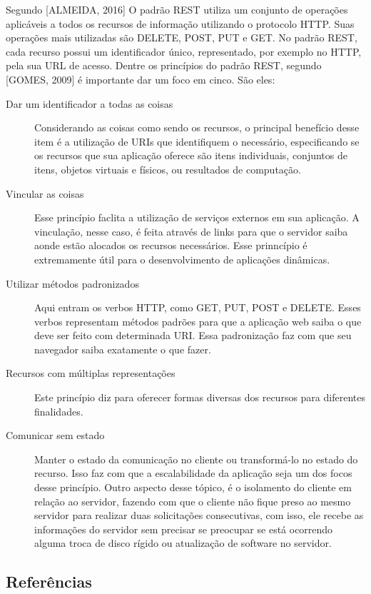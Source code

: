 \documentclass[
	12pt,				%
	oneside,			%
	a4paper,			%
	brazil				%
]{abntex2}
\begin{document}
{Segundo [ALMEIDA, 2016] O padrão REST utiliza um conjunto de operações aplicáveis a todos os recursos de informação utilizando o protocolo HTTP. Suas operações mais utilizadas são DELETE, POST, PUT e GET.
No padrão REST, cada recurso possui um identificador único, representado, por exemplo no HTTP, pela sua URL de acesso.
Dentre os princípios do padrão REST, segundo [GOMES, 2009] é importante dar um foco em cinco.
São eles: 
\begin{description}
\item[Dar um identificador a todas as coisas]
Considerando as coisas como sendo os recursos, o principal benefício desse item é a utilização de URIs que identifiquem o necessário, especificando se os recursos que sua aplicação oferece são itens individuais, conjuntos de itens, objetos virtuais e físicos, ou resultados de computação.  
\item[Vincular as coisas]
Esse princípio faclita a utilização de serviços externos em sua aplicação. A vinculação, nesse caso, é feita através de links para que o servidor saiba aonde estão alocados os recursos necessários. Esse prinncípio é extremamente útil para o desenvolvimento de aplicações dinâmicas.
\item[Utilizar métodos padronizados]
Aqui entram os verbos HTTP, como GET, PUT, POST e DELETE. Esses verbos representam métodos padrões para que a aplicação web saiba o que deve ser feito com determinada URI. Essa padronização faz com que seu navegador saiba exatamente o que fazer.
\item[Recursos com múltiplas representações]
Este princípio diz para oferecer formas diversas dos recursos para diferentes finalidades. 	
\item[Comunicar sem estado]
Manter o estado da comunicação no cliente ou transformá-lo no estado do recurso. Isso faz com que a escalabilidade da aplicação seja um dos focos desse princípio. Outro aspecto desse tópico, é o isolamento do cliente em relação ao servidor, fazendo com que o cliente não fique preso ao mesmo servidor para realizar duas solicitações consecutivas, com isso, ele recebe as informações do servidor sem precisar se preocupar se está ocorrendo alguma troca de disco rígido ou atualização de software no servidor.
\end{description} 


\subsection{Referências}

}
\end{document}
